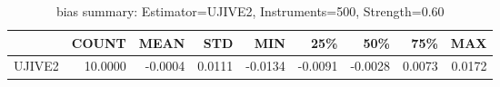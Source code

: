 \begin{table}[ht]
\centering
\caption{bias summary: Estimator=UJIVE2, Instruments=500, Strength=0.60}
\begin{tabular}{lrrrrrrrr}
\toprule
 & COUNT & MEAN & STD & MIN & 25\% & 50\% & 75\% & MAX \\
\midrule
UJIVE2 & 10.0000 & -0.0004 & 0.0111 & -0.0134 & -0.0091 & -0.0028 & 0.0073 & 0.0172 \\
\bottomrule
\end{tabular}
\end{table}
